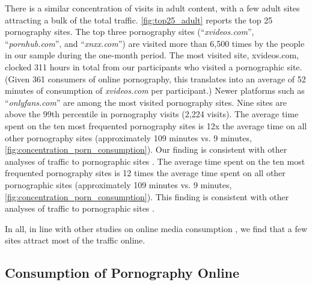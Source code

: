 \documentclass[12pt,twoside]{article}
\begin{document}
There is a similar concentration of visits in adult content, with a few adult sites attracting a bulk of the total traffic. \cref{fig:top25_adult} reports the top 25 pornography sites. The top three pornography sites (``\textit{xvideos.com}'', ``\textit{pornhub.com}'', and ``\textit{xnxx.com}'') are visited more than 6,500 times by the people in our sample during the one-month period. The most visited site, xvideos.com, clocked 311 hours in total from our participants who visited a pornographic site. (Given 361 consumers of online pornography, this translates into an average of 52 minutes of consumption of \textit{xvideos.com} per participant.) Newer platforms such as ``\textit{onlyfans.com}'' are among the most visited pornography sites. Nine sites are above the 99th percentile in pornography visits (2,224 visits). The average time spent on the ten most frequented pornography sites is 12x the average time on all other pornography sites (approximately 109 minutes vs. 9 minutes, \cref{fig:concentration_porn_consumption}). Our finding is consistent with other analyses of traffic to pornographic sites \cite{webporn}.
The average time spent on the ten most frequented pornography sites is 12 times the average time spent on all other pornographic sites (approximately 109 minutes vs. 9 minutes, \cref{fig:concentration_porn_consumption}). This finding is consistent with other analyses of traffic to pornographic sites \citep{webporn}.

In all, in line with other studies on online media consumption \citep{Dewan2004-tt, hindman2009myth, webporn}, we find that a few sites attract most of the traffic online.

\subsection{Consumption of Pornography Online}
\label{subsec:concentration_in_porn}
\end{document}
